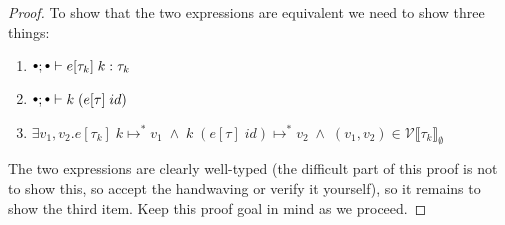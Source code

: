 \documentclass[a4paper,10pt,fleqn]{article}
\newcommand{\sem}[1]{\ensuremath{\llbracket #1 \rrbracket}}
\newcommand{\curly}[1]{\ensuremath{\mathcal{#1}}}
\newcommand{\evalto}{\ensuremath{\mapsto}}
\newcommand{\evaltos}[1][*]{\ensuremath{\evalto^{#1}}}
\newcommand{\mtenv}{{\raisebox{1.5pt}{$\scriptstyle\bullet$}}}
\newcommand{\pand}{\ensuremath{\; \wedge \;}}
\newcommand{\prep}[3]{\ensuremath{\curly{#1}\sem{#3}_{#2}}}
\newcommand{\vprep}[2][\rho]{\prep{V}{#1}{#2}}
\begin{document}
\begin{proof}
  To show that the two expressions are equivalent we need to show three things:
  \begin{enumerate}
  \item $\mtenv;\mtenv \vdash e[\tau_k] \; k : \tau_k$
  \item $\mtenv;\mtenv \vdash k\;(e[\tau] \; id)$
  \item $\exists v_1,v_2. e[\tau_k] \; k  \evaltos v_1 \pand k\;(e[\tau] \; id) \evaltos v_2 \pand (v_1,v_2) \in \vprep[\emptyset]{\tau_k}$
  \end{enumerate}
The two expressions are clearly well-typed (the difficult part of this proof is not to show this, so accept the handwaving or verify it yourself), so it remains to show the third item. Keep this proof goal in mind as we proceed.


\end{proof}
\end{document}

